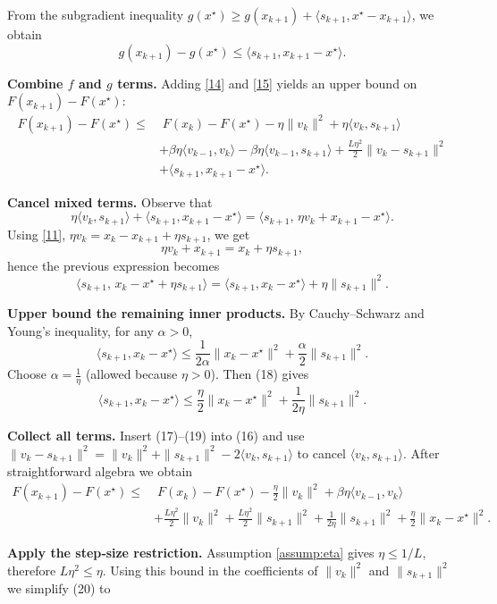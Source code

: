 \documentclass{article}
\begin{document}
\begin{enumerate}[label={[\textbf{Step \arabic*}]}]
From the subgradient inequality $g(x^\star)\ge g(x_{k+1})+\langle s_{k+1},x^\star-x_{k+1}\rangle$, we obtain
\[
g(x_{k+1})-g(x^\star)\le \langle s_{k+1},x_{k+1}-x^\star\rangle.
\tag{15}
\]
\item \textbf{Combine $f$ and $g$ terms.}  
Adding \eqref{14} and \eqref{15} yields an upper bound on $F(x_{k+1})-F(x^\star)$:
\[
\begin{aligned}
F(x_{k+1})-F(x^\star)\le &\;F(x_k)-F(x^\star)
-\eta\|v_k\|^{2}
+\eta\langle v_k,s_{k+1}\rangle\\
&+\beta\eta\langle v_{k-1},v_k\rangle
-\beta\eta\langle v_{k-1},s_{k+1}\rangle
+\frac{L\eta^{2}}{2}\|v_k-s_{k+1}\|^{2}\\
&+\langle s_{k+1},x_{k+1}-x^\star\rangle .
\end{aligned}
\tag{16}
\]
\item \textbf{Cancel mixed terms.}  
Observe that
\[
\eta\langle v_k,s_{k+1}\rangle+\langle s_{k+1},x_{k+1}-x^\star\rangle
= \langle s_{k+1},\,\eta v_k+x_{k+1}-x^\star\rangle.
\]
Using \eqref{11}, $\eta v_k = x_k-x_{k+1}+\eta s_{k+1}$, we get
\[
\eta v_k+x_{k+1}=x_k+\eta s_{k+1},
\]
hence the previous expression becomes
\[
\langle s_{k+1},\,x_k-x^\star+\eta s_{k+1}\rangle
= \langle s_{k+1},x_k-x^\star\rangle +\eta\|s_{k+1}\|^{2}.
\tag{17}
\]
\item \textbf{Upper bound the remaining inner products.}  
By Cauchy–Schwarz and Young’s inequality, for any $\alpha>0$,
\[
\langle s_{k+1},x_k-x^\star\rangle\le \frac{1}{2\alpha}\|x_k-x^\star\|^{2}
+\frac{\alpha}{2}\|s_{k+1}\|^{2}.
\tag{18}
\]
Choose $\alpha = \frac{1}{\eta}$ (allowed because $\eta>0$). Then (18) gives
\[
\langle s_{k+1},x_k-x^\star\rangle\le 
\frac{\eta}{2}\|x_k-x^\star\|^{2}
+\frac{1}{2\eta}\|s_{k+1}\|^{2}.
\tag{19}
\]
\item \textbf{Collect all terms.}  
Insert (17)–(19) into (16) and use $\|v_k-s_{k+1}\|^{2}= \|v_k\|^{2}+\|s_{k+1}\|^{2}-2\langle v_k,s_{k+1}\rangle$ to cancel $\langle v_k,s_{k+1}\rangle$. After straightforward algebra we obtain
\[
\begin{aligned}
F(x_{k+1})-F(x^\star)\le &\;F(x_k)-F(x^\star)
-\frac{\eta}{2}\|v_k\|^{2}
+\beta\eta\langle v_{k-1},v_k\rangle\\
&+\frac{L\eta^{2}}{2}\|v_k\|^{2}
+\frac{L\eta^{2}}{2}\|s_{k+1}\|^{2}
+\frac{1}{2\eta}\|s_{k+1}\|^{2}
+\frac{\eta}{2}\|x_k-x^\star\|^{2}.
\end{aligned}
\tag{20}
\]
\item \textbf{Apply the step‑size restriction.}  
Assumption \ref{assump:eta} gives $\eta\le 1/L$, therefore $L\eta^{2}\le\eta$.  Using this bound in the coefficients of $\|v_k\|^{2}$ and $\|s_{k+1}\|^{2}$ we simplify (20) to

\end{enumerate}
\end{document}
